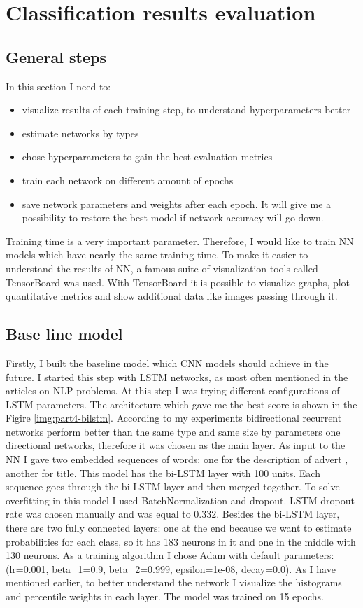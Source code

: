\chapter{Classification results evaluation} \label{chapt4}

\section{General steps} \label{sect4_1}
\noindent
In this section I need to:
\begin{itemize}
	\item visualize results of each training step, to understand hyperparameters better
	\item estimate networks by types 
	\item chose hyperparameters to gain the best evaluation metrics  
	\item train each network on different amount of epochs
	\item save network parameters and weights after each epoch. It will give me a possibility to restore the best model if network accuracy will go down.
\end{itemize}

\noindent
Training time is a very important parameter. Therefore, I would like to train NN models which have nearly the same training time. To make it easier to understand the results of NN, a famous suite of visualization tools called TensorBoard was used. With TensorBoard it is possible to visualize graphs, plot quantitative metrics and show additional data like images passing through it.  


\section{Base line model} \label{sect4_2}

Firstly, I built the baseline model which CNN models should achieve in the future. I started this step with LSTM networks, as most often mentioned in the articles on NLP problems. At this step I was trying different configurations of LSTM parameters. The architecture which gave me the best score is shown in the Figire \ref{img:part4-bilstm}. According to my experiments bidirectional recurrent networks perform better than the same type and same size by parameters one directional networks, therefore it was chosen as the main layer. As input to the NN I gave two embedded sequences of words: one for the description of advert , another for title. This model has the bi-LSTM layer with 100 units. Each sequence goes through the bi-LSTM layer and then merged together. To solve overfitting in this model I used BatchNormalization and dropout. LSTM dropout rate was chosen manually and was equal to 0.332. Besides the bi-LSTM layer, there are two fully connected layers: one at the end because we want to estimate probabilities for each class, so it has 183 neurons in it and one in the middle with 130 neurons. As a training algorithm I chose Adam with default parameters: (lr=0.001, beta\_1=0.9, beta\_2=0.999, epsilon=1e-08, decay=0.0). As I have mentioned earlier, to better understand the network I visualize the histograms and percentile weights in each layer. The model was trained on 15 epochs.


